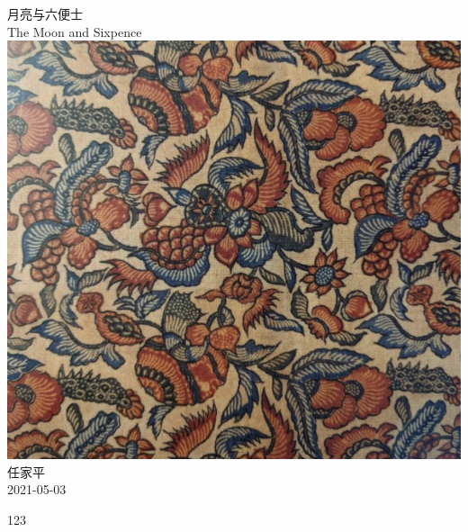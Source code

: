 \documentclass[a4paper, 12pt]{article}
\begin{document}
\begin{center}
    {\Huge 
        月亮与六便士 }\\[12pt]
    {\huge 
        The Moon and Sixpence}\\[20pt]
    
    \includegraphics[scale=0.8]{figure/cover.jpg} 
    \\[20pt] 

    {\Large 
        任家平\\[12pt]
        2021-05-03}
\end{center}
\thispagestyle{empty}



\newpage
{}
\tableofcontents
\newpage
{}

123
\end{document}
